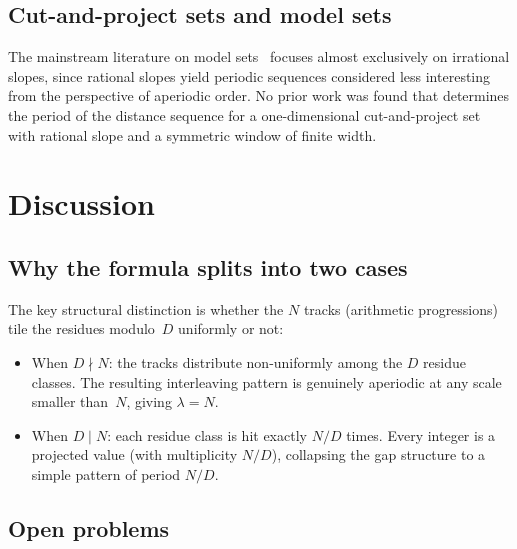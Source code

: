 \documentclass[11pt]{article}
\theoremstyle{plain}
\theoremstyle{definition}
\theoremstyle{remark}
\begin{document}
\subsection{Cut-and-project sets and model sets}

The mainstream literature on model sets~\cite{Senechal2009, Meyer1972,
HaynesEtAl2016} focuses almost exclusively on irrational slopes, since
rational slopes yield periodic sequences considered less interesting from
the perspective of aperiodic order.
No prior work was found that determines the period of the distance sequence
for a one-dimensional cut-and-project set with rational slope and a
symmetric window of finite width.

\section{Discussion}\label{sec:discussion}

\subsection{Why the formula splits into two cases}

The key structural distinction is whether the $N$ tracks (arithmetic
progressions) tile the residues modulo~$D$ uniformly or not:
\begin{itemize}
    \item When $D \nmid N$: the tracks distribute non-uniformly among the
          $D$ residue classes.  The resulting interleaving pattern is
          genuinely aperiodic at any scale smaller than~$N$, giving
          $\lambda = N$.
    \item When $D \mid N$: each residue class is hit exactly $N/D$ times.
          Every integer is a projected value (with multiplicity $N/D$),
          collapsing the gap structure to a simple pattern of period $N/D$.
\end{itemize}

\subsection{Open problems}
\end{document}
